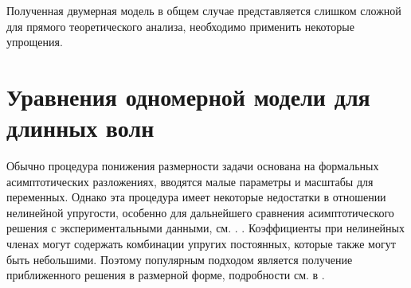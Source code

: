 Полученная двумерная модель в общем случае представляется слишком сложной для прямого теоретического анализа, необходимо применить некоторые упрощения.

\section{Уравнения одномерной модели для длинных волн}


Обычно процедура понижения размерности задачи основана на формальных асимптотических разложениях, вводятся малые параметры и масштабы для переменных. Однако эта процедура имеет некоторые недостатки в отношении нелинейной упругости, особенно для дальнейшего сравнения асимптотического решения с экспериментальными данными, см. \cite{Erofeyev2003, Samsonov2001, Porubov2003}. . Коэффициенты при нелинейных членах могут содержать комбинации упругих постоянных, которые также могут быть небольшими. Поэтому популярным подходом является получение приближенного решения в размерной форме, подробности см. в \cite{Erofeyev2003, Samsonov2001, Porubov2003}.

